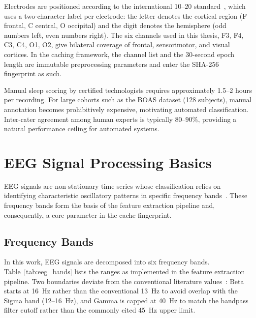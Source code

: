 Electrodes are positioned according to the international 10–20 
standard~\cite{niedermeyer2011}, which uses a two-character label 
per electrode: the letter denotes the cortical region (F frontal, 
C central, O occipital) and the digit denotes the hemisphere (odd numbers 
left, even numbers right). The six channels used in this thesis, 
F3, F4, C3, C4, O1, O2, give bilateral coverage of frontal, sensorimotor, 
and visual cortices. In the caching framework, the channel list and the 
30-second epoch length are immutable preprocessing parameters and enter 
the SHA-256 fingerprint as such.

Manual sleep scoring by certified technologists requires approximately
1.5--2 hours per recording. For large cohorts such as the BOAS dataset
(128 subjects), manual annotation becomes prohibitively expensive,
motivating automated classification. Inter-rater agreement among human
experts is typically 80--90\%, providing a natural performance ceiling
for automated systems.

\section{EEG Signal Processing Basics}
\label{sec:eeg_processing}

EEG signals are non-stationary time series whose classification relies on
identifying characteristic oscillatory patterns in specific frequency
bands~\cite{niedermeyer2011}. These frequency bands form the basis of the
feature extraction pipeline and, consequently, a core parameter in the
cache fingerprint.

\subsection{Frequency Bands}

In this work, EEG signals are decomposed into six frequency bands.
Table~\ref{tab:eeg_bands} lists the ranges as implemented in the feature
extraction pipeline. Two boundaries deviate from the conventional literature
values~\cite{niedermeyer2011}: Beta starts at 16~Hz rather than the
conventional 13~Hz to avoid overlap with the Sigma band (12--16~Hz), and
Gamma is capped at 40~Hz to match the bandpass filter cutoff rather than
the commonly cited 45~Hz upper limit.

